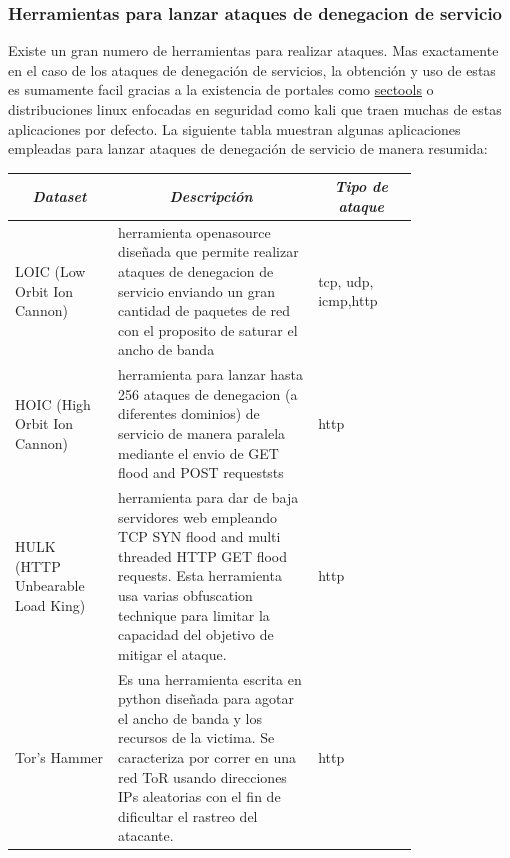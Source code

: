 \documentclass[12pt]{article}
\begin{document}
\newpage
{}
\recalctypearea

\FloatBarrier

\subsubsection{Herramientas para lanzar ataques de denegacion de servicio} 

Existe un gran numero de herramientas para realizar ataques. Mas exactamente en el caso de los ataques de denegación de servicios, la obtención y uso de estas es sumamente facil gracias a la existencia de portales como \href{http://sectools.org/}{sectools} o distribuciones linux enfocadas en seguridad como kali que traen muchas de estas aplicaciones por defecto. La siguiente tabla \citep{dos_tools} muestran algunas aplicaciones empleadas para lanzar ataques de denegación de servicio de manera resumida:

\begin{table}[htbp]
\centering
\begin{tabular}{|p{0.2\linewidth}|p{0.4\linewidth}|p{0.2\linewidth}|}
\hline
\multicolumn{1}{|c|}{\textit{\textbf{Dataset}}} & \multicolumn{1}{c|}{\textit{\textbf{Descripción}}} & \multicolumn{1}{c|}{\textit{\textbf{Tipo de ataque}}} \tabularnewline \hline
LOIC (Low Orbit Ion Cannon) & herramienta openasource diseñada que
permite realizar ataques de denegacion de servicio enviando un gran cantidad de paquetes de red con el proposito de saturar el ancho de banda & tcp, udp, icmp,http \tabularnewline \hline
HOIC (High Orbit Ion Cannon) & herramienta para lanzar hasta 256 ataques de denegacion (a diferentes dominios) de servicio de manera paralela mediante el envio de GET flood and POST requeststs & http \tabularnewline \hline
HULK (HTTP Unbearable Load King) & herramienta para dar de baja servidores web empleando TCP SYN flood and multi threaded HTTP GET flood requests. Esta herramienta usa varias obfuscation technique para limitar la capacidad del objetivo de mitigar el ataque. & http \tabularnewline \hline
Tor’s Hammer & Es una herramienta escrita en python diseñada para agotar el ancho de banda y los recursos de la victima. Se caracteriza por correr en una red ToR usando direcciones IPs aleatorias con el fin de dificultar el rastreo del atacante. & http \tabularnewline \hline
\end{tabular}
\end{table}
\end{document}
